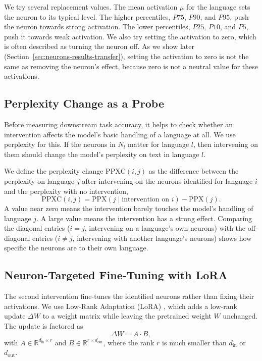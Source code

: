 We try several replacement values. The mean activation $\mu$ for the language sets
the neuron to its typical level. The higher percentiles, $P75$, $P90$, and $P95$,
push the neuron towards strong activation. The lower percentiles, $P25$, $P10$, and
$P5$, push it towards weak activation. We also try setting the activation to zero,
which is often described as turning the neuron off. As we show later
(Section~\ref{sec:neurons-results-transfer}), setting the activation to zero is not
the same as removing the neuron's effect, because zero is not a neutral value for
these activations.

\subsection{Perplexity Change as a Probe}
\label{subsec:neurons-ppxc}

Before measuring downstream task accuracy, it helps to check whether an
intervention affects the model's basic handling of a language at all. We use
perplexity for this. If the neurons in $N_l$ matter for language $l$, then
intervening on them should change the model's perplexity on text in language $l$.

We define the perplexity change $\mathrm{PPXC}(i,j)$ as the difference between the
perplexity on language $j$ after intervening on the neurons identified for language
$i$ and the perplexity with no intervention,
\begin{equation}
	\mathrm{PPXC}(i,j) = \mathrm{PPX}\!\left( j \mid \text{intervention on } i \right) - \mathrm{PPX}(j).
	\label{eq:neurons-ppxc}
\end{equation}
A value near zero means the intervention barely touches the model's handling of
language $j$. A large value means the intervention has a strong effect. Comparing
the diagonal entries ($i = j$, intervening on a language's own neurons) with the
off-diagonal entries ($i \neq j$, intervening with another language's neurons)
shows how specific the neurons are to their own language.

\subsection{Neuron-Targeted Fine-Tuning with LoRA}
\label{subsec:neurons-lora}

The second intervention fine-tunes the identified neurons rather than fixing their
activations. We use Low-Rank Adaptation (LoRA) \citep{hu2022lora}, which adds a
low-rank update $\Delta W$ to a weight matrix while leaving the pretrained weight
$W$ unchanged. The update is factored as
\begin{equation}
	\Delta W = A \cdot B,
	\label{eq:neurons-lora}
\end{equation}
with $A \in \mathbb{R}^{d_\text{in} \times r}$ and
$B \in \mathbb{R}^{r \times d_\text{out}}$, where the rank $r$ is much smaller than
$d_\text{in}$ or $d_\text{out}$.

